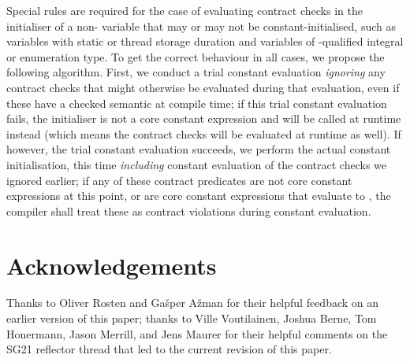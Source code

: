 Special rules are required for the case of evaluating contract checks in the initialiser of a non- variable that may or may not be constant-initialised, such as variables with static or thread storage duration and variables of -qualified integral or enumeration type. To get the correct behaviour in all cases, we propose the following algorithm. First, we conduct a trial constant evaluation \emph{ignoring} any contract checks that might otherwise be evaluated during that evaluation, even if these have a checked semantic at compile time; if this trial constant evaluation fails, the initialiser is not a core constant expression and will be called at runtime instead (which means the contract checks will be evaluated at runtime as well). If however, the trial constant evaluation succeeds, we perform the actual constant initialisation, this time \emph{including} constant evaluation of the contract checks we ignored earlier; if any of these contract predicates are not core constant expressions at this point, or are core constant expressions that evaluate to , the compiler shall treat these as contract violations during constant evaluation.




\section*{Acknowledgements}

Thanks to Oliver Rosten and Ga\v sper A\v zman for their helpful feedback on an earlier version of this paper; thanks to Ville Voutilainen, Joshua Berne, Tom Honermann, Jason Merrill, and Jens Maurer for their helpful comments on the SG21 reflector thread that led to the current revision of this paper.

\renewcommand{\bibname}{References}





